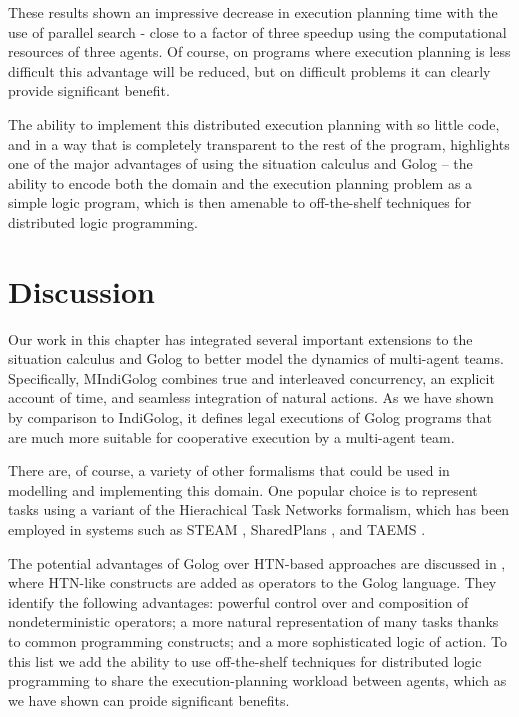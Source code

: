 These results shown an impressive decrease in execution planning time
with the use of parallel search - close to a factor of three speedup
using the computational resources of three agents. Of course, on programs
where execution planning is less difficult this advantage will be
reduced, but on difficult problems it can clearly provide significant
benefit.

The ability to implement this distributed execution planning with
so little code, and in a way that is completely transparent to the
rest of the program, highlights one of the major advantages of using
the situation calculus and Golog -- the ability to encode both the
domain and the execution planning problem as a simple logic program,
which is then amenable to off-the-shelf techniques for distributed
logic programming.


\section{Discussion\label{sec:MIndiGolog:Discussion}}

Our work in this chapter has integrated several important extensions
to the situation calculus and Golog to better model the dynamics of
multi-agent teams. Specifically, MIndiGolog combines true and interleaved
concurrency, an explicit account of time, and seamless integration
of natural actions. As we have shown by comparison to IndiGolog, it
defines legal executions of Golog programs that are much more suitable
for cooperative execution by a multi-agent team.

There are, of course, a variety of other formalisms that could be
used in modelling and implementing this domain. One popular choice
is to represent tasks using a variant of the Hierachical Task Networks
formalism, which has been employed in systems such as STEAM \citep{tambe97flexible_teamwork},
SharedPlans \citep{grosz99planning_together}, and TAEMS \citep{decker95designing_coordination}.

The potential advantages of Golog over HTN-based approaches are discussed
in \citep{son00htn_golog}, where HTN-like constructs are added as
operators to the Golog language. They identify the following advantages:
powerful control over and composition of nondeterministic operators;
a more natural representation of many tasks thanks to common programming
constructs; and a more sophisticated logic of action. To this list
we add the ability to use off-the-shelf techniques for distributed
logic programming to share the execution-planning workload between
agents, which as we have shown can proide significant benefits.

